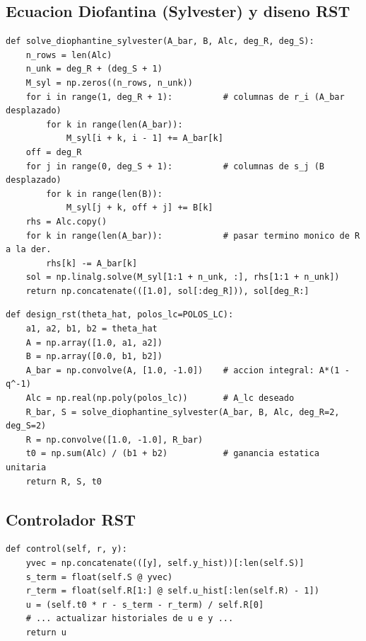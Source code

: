 \documentclass[a4paper,11pt]{report}
\begin{document}
\subsection{Ecuacion Diofantina (Sylvester) y diseno RST}

\begin{lstlisting}[caption={Armado de la matriz de Sylvester y resolucion.}]
def solve_diophantine_sylvester(A_bar, B, Alc, deg_R, deg_S):
    n_rows = len(Alc)
    n_unk = deg_R + (deg_S + 1)
    M_syl = np.zeros((n_rows, n_unk))
    for i in range(1, deg_R + 1):          # columnas de r_i (A_bar desplazado)
        for k in range(len(A_bar)):
            M_syl[i + k, i - 1] += A_bar[k]
    off = deg_R
    for j in range(0, deg_S + 1):          # columnas de s_j (B desplazado)
        for k in range(len(B)):
            M_syl[j + k, off + j] += B[k]
    rhs = Alc.copy()
    for k in range(len(A_bar)):            # pasar termino monico de R a la der.
        rhs[k] -= A_bar[k]
    sol = np.linalg.solve(M_syl[1:1 + n_unk, :], rhs[1:1 + n_unk])
    return np.concatenate(([1.0], sol[:deg_R])), sol[deg_R:]
\end{lstlisting}

\begin{lstlisting}[caption={Diseno del regulador con accion integral y sin cancelacion.}]
def design_rst(theta_hat, polos_lc=POLOS_LC):
    a1, a2, b1, b2 = theta_hat
    A = np.array([1.0, a1, a2])
    B = np.array([0.0, b1, b2])
    A_bar = np.convolve(A, [1.0, -1.0])    # accion integral: A*(1 - q^-1)
    Alc = np.real(np.poly(polos_lc))       # A_lc deseado
    R_bar, S = solve_diophantine_sylvester(A_bar, B, Alc, deg_R=2, deg_S=2)
    R = np.convolve([1.0, -1.0], R_bar)
    t0 = np.sum(Alc) / (b1 + b2)           # ganancia estatica unitaria
    return R, S, t0
\end{lstlisting}

\subsection{Controlador RST}

\begin{lstlisting}[caption={Ley recursiva R u = T r - S y.}]
def control(self, r, y):
    yvec = np.concatenate(([y], self.y_hist))[:len(self.S)]
    s_term = float(self.S @ yvec)
    r_term = float(self.R[1:] @ self.u_hist[:len(self.R) - 1])
    u = (self.t0 * r - s_term - r_term) / self.R[0]
    # ... actualizar historiales de u e y ...
    return u
\end{lstlisting}
\end{document}
